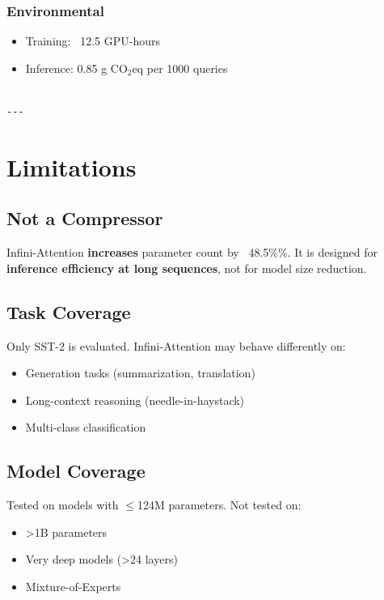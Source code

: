 \subsubsection{Environmental}
\begin{itemize}
\item Training: ~12.5 GPU-hours
\item Inference: 0.85 g CO$_2$eq per 1000 queries
\end{itemize}
\begin{lstlisting}

---
\end{lstlisting}


\section{Limitations}

\subsection{Not a Compressor}

Infini-Attention \textbf{increases} parameter count by ~48.5\%\%. It is 
designed for \textbf{inference efficiency at long sequences}, not for model 
size reduction.

\subsection{Task Coverage}

Only SST-2 is evaluated. Infini-Attention may behave differently on:

\begin{itemize}
\item Generation tasks (summarization, translation)
\item Long-context reasoning (needle-in-haystack)
\item Multi-class classification

\end{itemize}
\subsection{Model Coverage}

Tested on models with $\le$124M parameters. Not tested on:

\begin{itemize}
\item \textgreater{}1B parameters
\item Very deep models (\textgreater{}24 layers)
\item Mixture-of-Experts

\end{itemize}

